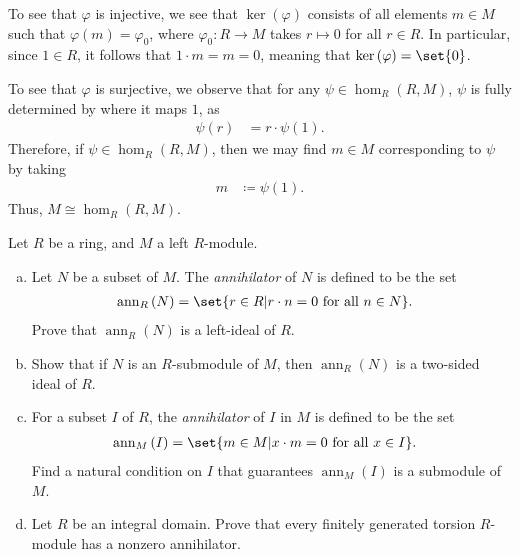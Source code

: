 \documentclass[10pt]{mypackage}
\begin{document}
\begin{solution}
\begin{enumerate}[(a)]
      To see that $\varphi$ is injective, we see that $\ker\left( \varphi \right)$ consists of all elements $m\in M$ such that $\varphi(m) = \varphi_0$, where $\varphi_0\colon R\rightarrow M$ takes $r\mapsto 0$ for all $r\in R$. In particular, since $1\in R$, it follows that $1\cdot m = m = 0$, meaning that $\ker\left( \varphi \right) = \set{0}$.\newline

      To see that $\varphi$ is surjective, we observe that for any $\psi\in \hom_{R}\left( R,M \right)$, $\psi$ is fully determined by where it maps $1$, as
      \begin{align*}
        \psi(r) &= r\cdot \psi(1).
      \end{align*}
      Therefore, if $\psi\in \hom_{R}\left( R,M \right)$, then we may find $m\in M$ corresponding to $\psi$ by taking
      \begin{align*}
        m &\coloneq \psi(1).
      \end{align*}
      Thus, $M\cong \hom_{R}\left( R,M \right)$.
  \end{enumerate}
\end{solution}
\begin{problem}[Problem 3]
  Let $R$ be a ring, and $M$ a left $R$-module.
  \begin{enumerate}[(a)]
    \item Let $N$ be a subset of $M$. The \textit{annihilator} of $N$ is defined to be the set
      \begin{align*}
        \operatorname{ann}_R\left( N \right) &= \set{r\in R | r\cdot n = 0\text{ for all }n\in N}.
      \end{align*}
      Prove that $\operatorname{ann}_R(N)$ is a left-ideal of $R$.
    \item Show that if $N$ is an $R$-submodule of $M$, then $\operatorname{ann}_R\left( N \right)$ is a two-sided ideal of $R$.
    \item For a subset $I$ of $R$, the \textit{annihilator} of $I$ in $M$ is defined to be the set
      \begin{align*}
        \operatorname{ann}_M\left( I \right) &= \set{m\in M | x\cdot m = 0\text{ for all }x\in I}.
      \end{align*}
      Find a natural condition on $I$ that guarantees $\operatorname{ann}_M(I)$ is a submodule of $M$.
    \item Let $R$ be an integral domain. Prove that every finitely generated torsion $R$-module has a nonzero annihilator.
  \end{enumerate}
\end{problem}
\end{document}
